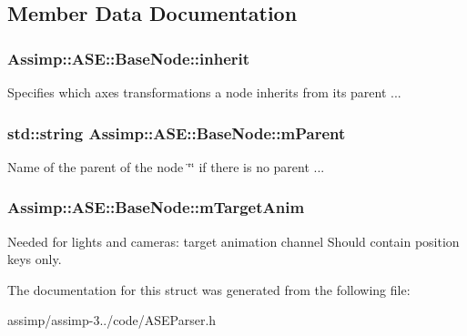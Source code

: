 \subsection{Member Data Documentation}
\hypertarget{struct_assimp_1_1_a_s_e_1_1_base_node_a3ba9514175a7012d01f182d4150bf136}{
\subsubsection[{inherit}]{ Assimp\+::\+A\+S\+E\+::\+Base\+Node\+::inherit}}\label{struct_assimp_1_1_a_s_e_1_1_base_node_a3ba9514175a7012d01f182d4150bf136}
Specifies which axes transformations a node inherits from its parent ... \hypertarget{struct_assimp_1_1_a_s_e_1_1_base_node_a65c3ff02a4f7a4f7548dbab107b0e026}{
\subsubsection[{m\+Parent}]{\setlength{\rightskip}{0pt plus 5cm}std\+::string Assimp\+::\+A\+S\+E\+::\+Base\+Node\+::m\+Parent}}\label{struct_assimp_1_1_a_s_e_1_1_base_node_a65c3ff02a4f7a4f7548dbab107b0e026}
Name of the parent of the node \char`\"{}\char`\"{} if there is no parent ... \hypertarget{struct_assimp_1_1_a_s_e_1_1_base_node_a414f10a3fca66246abf5e111414d90b0}{
\subsubsection[{m\+Target\+Anim}]{ Assimp\+::\+A\+S\+E\+::\+Base\+Node\+::m\+Target\+Anim}}\label{struct_assimp_1_1_a_s_e_1_1_base_node_a414f10a3fca66246abf5e111414d90b0}
Needed for lights and cameras\+: target animation channel Should contain position keys only. 

The documentation for this struct was generated from the following file\+:\begin{DoxyCompactItemize}
\item 
assimp/assimp-\/3../code/A\+S\+E\+Parser.\+h\end{DoxyCompactItemize}
